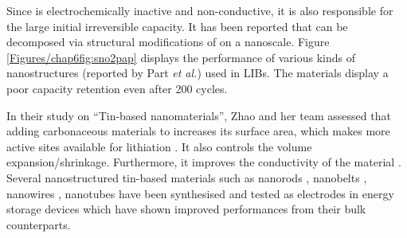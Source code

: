 Since  is electrochemically inactive and non-conductive, it is also responsible for the large initial irreversible capacity. It has been reported that  can be decomposed via structural modifications of  on a nanoscale. Figure \ref{Figures/chap6fig:sno2pap} displays the performance of various kinds of  nanostructures (reported by Part \textit{et al.}) used in LIBs. The materials display a poor capacity retention even after 200 cycles.   

In their study on \enquote{Tin-based nanomaterials}, Zhao and her team assessed that adding carbonaceous materials to  increases its surface area, which makes more active sites available for lithiation \cite{navarrosuarez_2d_2018}. It also controls the volume expansion/shrinkage. Furthermore, it improves the conductivity of the material \cite{nowak_composites_2018}. Several nanostructured tin-based materials such as nanorods \cite{liu_direct_2009}, nanobelts \cite{duan_single_2005}, nanowires \cite{huang_situ_2010}, nanotubes \cite{wang_large-scale_2011} have been synthesised and tested as electrodes in energy storage devices which have shown improved performances from their bulk counterparts. 

